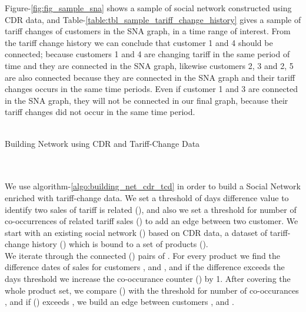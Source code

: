 \documentclass[11pt]{article}
\begin{document}
Figure-\ref{fig:fig_sample_sna} shows a sample of social network constructed using CDR data, and Table-\ref{table:tbl_sample_tariff_change_history} gives a sample of tariff changes of customers in the SNA graph, in a time range of interest. From the tariff change history we can conclude that customer 1 and 4 should be connected; because customers 1 and 4 are changing tariff in the same period of time and they are connected in the SNA graph, likewise customers 2, 3 and 2, 5 are also connected because they are connected in the SNA graph and their tariff changes occurs in the same time periods. Even if customer 1 and 3 are connected in the SNA graph, they will not be connected in our final graph, because their tariff changes did not occur in the same time period.\\
 \\
\begin{algorithm}[H]
\DontPrintSemicolon
{}
\;
\caption{Building Network using CDR and Tariff-Change Data}
\label{algo:building_net_cdr_tcd}
\end{algorithm}
\\ 
\\
We use algorithm-\ref{algo:building_net_cdr_tcd} in order to build a Social Network enriched with tariff-change data. We set a threshold of days difference value to identify two sales of tariff is related (), and also we set a threshold for number of co-occurrences of related tariff sales () to add an edge between two customer. We start with an existing social network () based on CDR data, a dataset of tariff-change history () which is bound to a set of products ().\\
We iterate through the connected () pairs of . For every product  we find the difference dates of sales for customers 
, and , and if the difference exceeds the days threshold  we increase the co-occurance counter () by 1. After covering the whole product set, we compare () with the threshold for number of co-occurances , and if () exceeds , we build an edge between customers , and .
\end{document}
